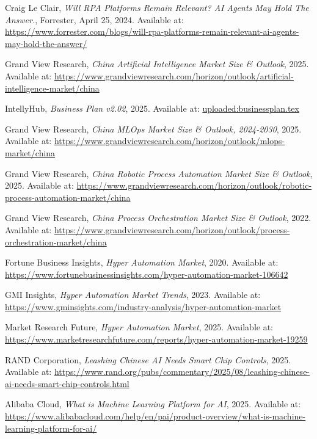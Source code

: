 \documentclass[11点, A4纸, 单面]{article}
\begin{document}
\begin{thebibliography}{99}
    Craig Le Clair, \textit{Will RPA Platforms Remain Relevant? AI Agents May Hold The Answer.}, Forrester, April 25, 2024. Available at: \url{https://www.forrester.com/blogs/will-rpa-platforms-remain-relevant-ai-agents-may-hold-the-answer/}
    
    Grand View Research, \textit{China Artificial Intelligence Market Size \& Outlook}, 2025. Available at: \url{https://www.grandviewresearch.com/horizon/outlook/artificial-intelligence-market/china}

    IntellyHub, \textit{Business Plan v2.02}, 2025. Available at: \url{uploaded:businessplan.tex}

    Grand View Research, \textit{China MLOps Market Size \& Outlook, 2024-2030}, 2025. Available at: \url{https://www.grandviewresearch.com/horizon/outlook/mlops-market/china}

    Grand View Research, \textit{China Robotic Process Automation Market Size \& Outlook}, 2025. Available at: \url{https://www.grandviewresearch.com/horizon/outlook/robotic-process-automation-market/china}

    Grand View Research, \textit{China Process Orchestration Market Size \& Outlook}, 2022. Available at: \url{https://www.grandviewresearch.com/horizon/outlook/process-orchestration-market/china}

    Fortune Business Insights, \textit{Hyper Automation Market}, 2020. Available at: \url{https://www.fortunebusinessinsights.com/hyper-automation-market-106642}

    GMI Insights, \textit{Hyper Automation Market Trends}, 2023. Available at: \url{https://www.gminsights.com/industry-analysis/hyper-automation-market}

    Market Research Future, \textit{Hyper Automation Market}, 2025. Available at: \url{https://www.marketresearchfuture.com/reports/hyper-automation-market-19259}
    
    RAND Corporation, \textit{Leashing Chinese AI Needs Smart Chip Controls}, 2025. Available at: \url{https://www.rand.org/pubs/commentary/2025/08/leashing-chinese-ai-needs-smart-chip-controls.html}

    Alibaba Cloud, \textit{What is Machine Learning Platform for AI}, 2025. Available at: \url{https://www.alibabacloud.com/help/en/pai/product-overview/what-is-machine-learning-platform-for-ai/}


\end{thebibliography}
\end{document}
